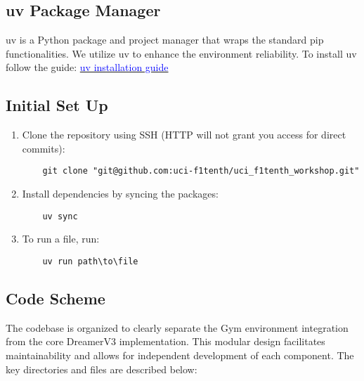 \subsection{uv Package Manager}
uv is a Python package and project manager that wraps the standard pip functionalities. We utilize uv to enhance the environment reliability. To install uv follow the guide:
\href{https://docs.astral.sh/uv/getting-started/installation/#standalone-installer}{\textcolor{blue}{uv installation guide}}

\subsection{Initial Set Up}
\begin{enumerate}
    \item Clone the repository using SSH (HTTP will not grant you access for direct commits):
    \begin{verbatim}
    git clone "git@github.com:uci-f1tenth/uci_f1tenth_workshop.git"
    \end{verbatim}
    \item Install dependencies by syncing the packages:
    \begin{verbatim}
    uv sync
    \end{verbatim}
    \item To run a file, run:
    \begin{verbatim}
    uv run path\to\file
    \end{verbatim}
    
\end{enumerate}

\subsection{Code Scheme}
The codebase is organized to clearly separate the Gym environment integration from the core DreamerV3 implementation.  This modular design facilitates maintainability and allows for independent development of each component.  The key directories and files are described below:

